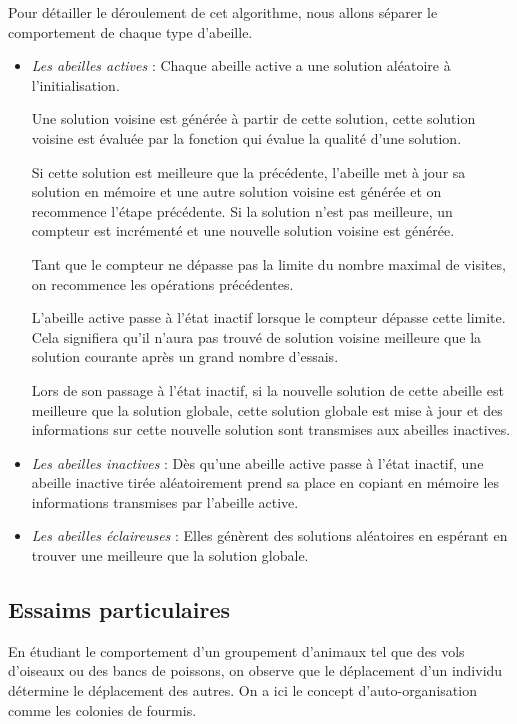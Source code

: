 \documentclass[12pt]{article}
\begin{document}
Pour détailler le déroulement de cet algorithme, nous allons séparer le comportement de chaque type d'abeille. 
\begin{itemize}
\item \emph{ Les abeilles actives } : Chaque abeille active a une solution aléatoire à l'initialisation. 

Une solution voisine est générée à partir de cette solution, cette solution voisine est évaluée par la fonction qui évalue la qualité d'une solution. 

Si cette solution est meilleure que la précédente, l'abeille met à jour sa solution en mémoire et une autre solution voisine est générée et  on recommence l'étape précédente. 
Si la solution n'est pas meilleure, un compteur est incrémenté et une nouvelle solution voisine est générée.  

Tant que le compteur ne dépasse pas la limite du nombre maximal de visites, on recommence les opérations précédentes. 

L'abeille active passe à l'état inactif lorsque le compteur dépasse cette limite. Cela signifiera qu'il n'aura pas trouvé de solution voisine meilleure que la solution courante après un grand nombre d'essais. 

Lors de son passage à l'état inactif, si la nouvelle solution de cette abeille est meilleure que la solution globale, cette solution globale est mise à jour et des informations sur cette nouvelle solution sont transmises aux abeilles inactives. 

\item \emph{ Les abeilles inactives} : Dès qu'une abeille active passe à l'état inactif, une abeille inactive tirée aléatoirement prend sa place en copiant en mémoire les informations transmises par l'abeille active.

\item \emph{Les abeilles éclaireuses} : Elles génèrent des solutions aléatoires en espérant en trouver une meilleure que la solution globale. 


\end{itemize}

\subsection{Essaims particulaires \cite{essaim1} }

    En étudiant le comportement d'un groupement d'animaux tel que des vols d'oiseaux ou des bancs de poissons, on observe que le déplacement d'un individu détermine le déplacement des autres. On a ici le concept d'auto-organisation comme les colonies de fourmis. 
\end{document}
